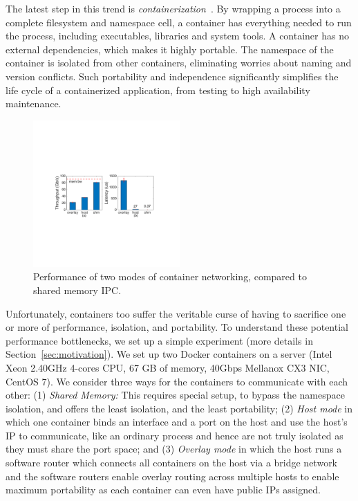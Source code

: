 The latest step in this trend is {\em containerization}~\cite{XXX}.  By wrapping a process
into a complete filesystem and namespace cell, a container has everything needed
to run the process, including executables, libraries and system tools.  A
container has no external dependencies, which makes it highly portable. The
namespace of the container is isolated from other containers, eliminating
worries about naming and version conflicts.  Such portability and independence
significantly simplifies the life cycle of a containerized application, from
testing to high availability maintenance. 


\begin{figure}[th]
     \centering 
     \includegraphics[width=0.5\textwidth]{figures/intro/intro_exist2.pdf} 
     \caption{Performance of two modes of container networking, compared to
     shared memory IPC.} 
     \label{fig:three_modes} 
\end{figure} 
 Unfortunately, containers too suffer the veritable curse of having 
 to sacrifice one or more of performance, isolation, and portability. 
 To understand these potential performance bottlenecks, we set up a simple experiment (more details in Section~\ref{sec:motivation}).  
 We set up two Docker containers on a
server (Intel Xeon 2.40GHz 4-cores CPU, 67 GB of memory, 40Gbps Mellanox CX3
NIC, CentOS 7). We consider three ways for the containers to communicate with
each other: (1) {\em Shared Memory:} This requires special setup,
to bypass the namespace isolation, and offers the least isolation, and the least portability;
 (2) {\em Host  mode} 
in which one container binds an interface and a port on the host and use the
host's IP to communicate, like an ordinary process and hence 
 are not truly isolated as they must share the port space; and (3)  {\em Overlay mode} in which the host runs a software
router which connects all containers on the host via  a bridge network and the software routers enable 
 overlay routing across multiple hosts to enable maximum portability as  each container can even have public IPs assigned.



